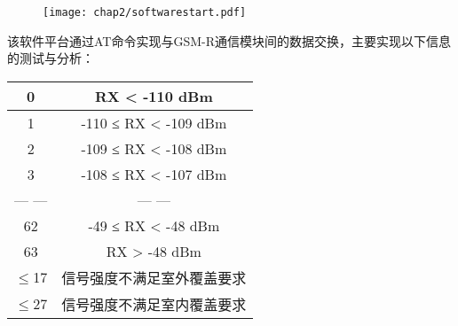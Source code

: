 \begin{figure}[!htp]
\centering
    \texttt{[image: chap2/softwarestart.pdf]}
\end{figure}

该软件平台通过AT命令实现与GSM-R通信模块间的数据交换，主要实现以下信息的测试与分析：

\begin{table}[!htp]
\renewcommand{\arraystretch}{1}
\centering
\begin{threeparttable}[b]
\begin{tabular}{cc}
\hline
0        & RX < -110 dBm \\
\hline
1        & -110 ≤ RX < -109 dBm \\
\hline
2        & -109 ≤ RX < -108 dBm \\
\hline
3        & -108 ≤ RX < -107 dBm \\
\hline
--- ---      & --- --- \\
\hline
62       & -49 ≤ RX < -48 dBm \\
\hline
63       & RX > -48 dBm \\
\hline
$\leq$17 & 信号强度不满足室外覆盖要求 \\
\hline
$\leq$27 & 信号强度不满足室内覆盖要求 \\
\hline
\end{tabular}
\end{threeparttable}
\end{table}

